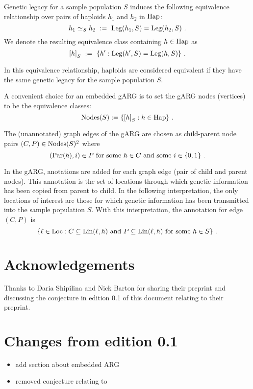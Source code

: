 Genetic legacy for a sample population $S$ induces the following
equivalence relationship over pairs of haploids $h_1$ and $h_2$ in
$\mathrm{Hap}$:
$$
h_1 \simeq_S h_2 \ := \ \mathrm{Leg}(h_1, S) = \mathrm{Leg}(h_2, S)
\text{ .}
$$
We denote the resulting equivalence class containing $h \in \mathrm{Hap}$ as
$$
{[h]}_S \ := \ \{ h' : \mathrm{Leg}(h', S) = \mathrm{Leg}(h, S) \}
\text{ .}
$$

In this equivalence relationship, haploids are considered equivalent if
they have the same genetic legacy for the sample population $S$.

A convenient choice for an embedded gARG \cite{wong_what_arg_2022} is
to set the gARG nodes (vertices) to be the equivalence classes:
$$
   \mathrm{Nodes}(S) := \{ {[h]}_S : h \in \mathrm{Hap} \}
\text{ .}
$$

The (unannotated) graph edges of the gARG are chosen as child-parent
node pairs $(C, P) \in \mathrm{Nodes}(S)^2$ where
$$
  (\mathrm{Par}(h), i) \in P \text{ for some $h \in C$ and some $i \in \{0, 1\}$ .}
$$

In the gARG, anotations are added for each graph edge (pair of child
and parent nodes). This annotation is the set of locations through which
genetic information has been copied from parent to child. In the
following interpretation, the only locations of interest are those for
which genetic information has been transmitted into the sample
population $S$. With this interpretation, the annotation for edge
$(C,P)$ is
$$
  \{ \ell \in \mathrm{Loc} :
     C \subseteq \mathrm{Lin}(\ell, h) \text{ and } P \subseteq \mathrm{Lin}(\ell, h) \text{ for some $h \in S$}
  \}
\text{ .}
$$

\section{Acknowledgements}

Thanks to Daria Shipilina and Nick Barton for sharing their preprint
\cite{shipilina_origin_2022} and discussing the conjecture in edition
0.1 of this document relating to their preprint.

\section{Changes from edition 0.1}

\begin{itemize}
\item
  add section about embedded ARG
\item
  removed conjecture relating to \cite{shipilina_origin_2022}
\end{itemize}


\printbibliography %

